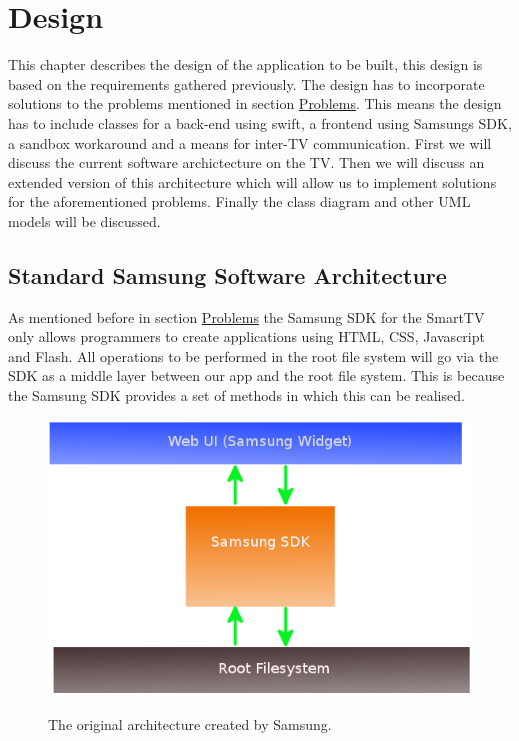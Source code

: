 \chapter{Design}
This chapter describes the design of the application to be built, this design is based on the requirements gathered previously. The design has to
incorporate solutions to the problems mentioned in section \hyperref[sec:problems]{Problems}.
This means the design has to include classes for a back-end using swift, a frontend using Samsung\textquotesingle s SDK, a sandbox workaround and a
 means for inter-TV communication. First we will discuss the current software archictecture on the TV. Then we will discuss an extended version of
 this architecture which will allow us to implement solutions for the aforementioned problems. Finally the class diagram and other UML models will be discussed.

\section{Standard Samsung Software Architecture}
As mentioned before in section \hyperref[sec:problems]{Problems}
the Samsung SDK for the SmartTV only allows programmers to create applications using HTML, CSS, Javascript and Flash.
All operations to be performed in the root file system will go via the SDK as a middle layer between our app and the root file system. This is
because the Samsung SDK provides a set of methods in which this can be realised.

\begin{center}
\begin{figure}[h]
	\centering
	\mbox{\includegraphics[width=1\textwidth]{Images/original_architecture.png}}
	\label{fig:original_architecture}
	\caption{The original architecture created by Samsung.}
\end{figure}
\end{center}

